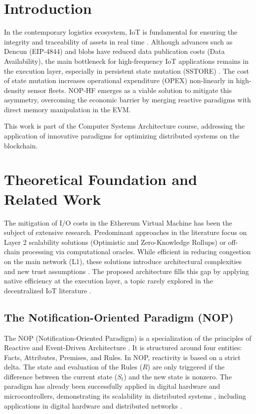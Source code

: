 \documentclass[conference]{IEEEtran}
\begin{document}
\section{Introduction}
In the contemporary logistics ecosystem, IoT is fundamental for ensuring the integrity and traceability of assets in real time \cite{mdpi_coldchain}. Although advances such as Dencun (EIP-4844) and blobs \cite{eip4844} have reduced data publication costs (Data Availability), the main bottleneck for high-frequency IoT applications remains in the execution layer, especially in persistent state mutation (SSTORE) \cite{perez2020}. The cost of state mutation increases operational expenditure (OPEX) non-linearly in high-density sensor fleets. NOP-HF emerges as a viable solution to mitigate this asymmetry, overcoming the economic barrier by merging reactive paradigms with direct memory manipulation in the EVM.\par

This work is part of the Computer Systems Architecture course, addressing the application of innovative paradigms for optimizing distributed systems on the blockchain.

\section{Theoretical Foundation and Related Work}
The mitigation of I/O costs in the Ethereum Virtual Machine has been the subject of extensive research. Predominant approaches in the literature focus on Layer 2 scalability solutions (Optimistic and Zero-Knowledge Rollups) or off-chain processing via computational oracles. While efficient in reducing congestion on the main network (L1), these solutions introduce architectural complexities and new trust assumptions \cite{sstore_costs}. The proposed architecture fills this gap by applying native efficiency at the execution layer, a topic rarely explored in the decentralized IoT literature \cite{reyna2018} \cite{saberi2019}.


\subsection{The Notification-Oriented Paradigm (NOP)}
The NOP (Notification-Oriented Paradigm) is a specialization of the principles of Reactive and Event-Driven Architecture \cite{simao2012} \cite{simao2016}. It is structured around four entities: Facts, Attributes, Premises, and Rules. In NOP, reactivity is based on a strict delta. The state and evaluation of the Rules ($R$) are only triggered if the difference between the current state ($S_t$) and the new state is nonzero. The paradigm has already been successfully applied in digital hardware and microcontrollers, demonstrating its scalability in distributed systems \cite{nop_hardware} \cite{nop_microcontroladores}, including applications in digital hardware \cite{nop_patent} and distributed networks \cite{nop_ip}.
\end{document}

